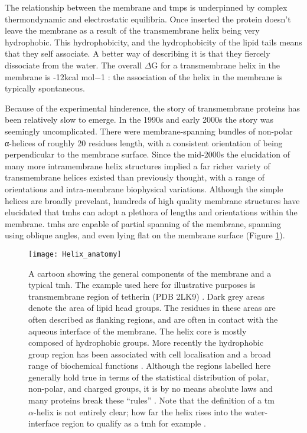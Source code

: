

The relationship between the membrane and \gls{tmp}s is underpinned by complex thermondynamic and electrostatic equilibria. Once inserted the protein doesn't leave the membrane as a result of the transmembrane helix being very hydrophobic. This hydrophobicity, and the hydrophobicity of the lipid tails means that they self associate. A better way of describing it is that they fiercely dissociate from the water. The overall $\Delta$G for a transmembrane helix in the membrane is -12kcal mol−1 \cite{Cymer2014}: the association of the helix in the membrane is typically spontaneous.

Because of the experimental hinderence, the story of transmembrane proteins has been relatively slow to emerge. In the 1990s and early 2000s the story was seemingly uncomplicated. There were membrane-spanning bundles of non-polar α-helices of roughly 20 residues length, with a consistent orientation of being perpendicular to the membrane surface. Since the mid-2000s the elucidation of many more intramembrane helix structures implied a far richer variety of transmembrane helices existed than previously thought, with a range of orientations and intra-membrane biophysical variations. Although the simple helices are broadly prevelant, hundreds of high quality membrane structures have elucidated that \gls{tmh}s can adopt a plethora of lengths and orientations within the membrane. \gls{tmh}s are capable of partial spanning of the membrane, spanning using oblique angles, and even lying flat on the membrane surface \cite{VonHeijne2006, Elofsson2007} (Figure \ref{fig:helixcartoon1}).

\begin{figure}[!ht]
\centering
\texttt{[image: Helix\_anatomy]}
\caption{A cartoon showing the general components of the membrane and a typical \gls{tmh}. The example used here for illustrative purposes is transmembrane region of tetherin (PDB 2LK9) \cite{Skasko2012}. Dark grey areas denote the area of lipid head groups. The residues in these areas are often described as flanking regions, and are often in contact with the aqueous interface of the membrane. The helix core is mostly composed of hydrophobic groups. More recently the hydrophobic group region has been associated with cell localisation and a broad range of biochemical functions \cite{Junne2010, Wong2012}. Although the regions labelled here generally hold true in terms of the statistical distribution of polar, non-polar, and charged groups, it is by no means absolute laws and many proteins break these ``rules'' \cite{Sharpe2010, Baeza-Delgado2013, Pogozheva2013}. Note that the definition of a \gls{tm} $\alpha$-helix is not entirely clear; how far the helix rises into the water-interface region to qualify as a \gls{tmh} for example \cite{VonHeijne2006}.}
\label{fig:helixcartoon1}
\end{figure}


